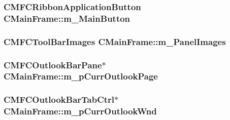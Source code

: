 \subsubsection[{m\+\_\+\+Main\+Button}]{\setlength{\rightskip}{0pt plus 5cm}C\+M\+F\+C\+Ribbon\+Application\+Button C\+Main\+Frame\+::m\+\_\+\+Main\+Button\hspace{0.3cm}{\ttfamily [protected]}}\label{class_c_main_frame_a07959a072f4e0c828d26b178f6fd3bd1}
\hypertarget{class_c_main_frame_adeaf09af6cba27e80fb5c225cec4a428}{}
\subsubsection[{m\+\_\+\+Panel\+Images}]{\setlength{\rightskip}{0pt plus 5cm}C\+M\+F\+C\+Tool\+Bar\+Images C\+Main\+Frame\+::m\+\_\+\+Panel\+Images\hspace{0.3cm}{\ttfamily [protected]}}\label{class_c_main_frame_adeaf09af6cba27e80fb5c225cec4a428}
\hypertarget{class_c_main_frame_a5bbdfede2f23d5277120adafbe635081}{}
\subsubsection[{m\+\_\+p\+Curr\+Outlook\+Page}]{\setlength{\rightskip}{0pt plus 5cm}C\+M\+F\+C\+Outlook\+Bar\+Pane$\ast$ C\+Main\+Frame\+::m\+\_\+p\+Curr\+Outlook\+Page\hspace{0.3cm}{\ttfamily [protected]}}\label{class_c_main_frame_a5bbdfede2f23d5277120adafbe635081}
\hypertarget{class_c_main_frame_a115f4d41a1cd30c24f777b5b50d9ee20}{}
\subsubsection[{m\+\_\+p\+Curr\+Outlook\+Wnd}]{\setlength{\rightskip}{0pt plus 5cm}C\+M\+F\+C\+Outlook\+Bar\+Tab\+Ctrl$\ast$ C\+Main\+Frame\+::m\+\_\+p\+Curr\+Outlook\+Wnd\hspace{0.3cm}{\ttfamily [protected]}}\label{class_c_main_frame_a115f4d41a1cd30c24f777b5b50d9ee20}
\hypertarget{class_c_main_frame_ad79f402fcb6d292fde67d37ad10ec7f3}{}
